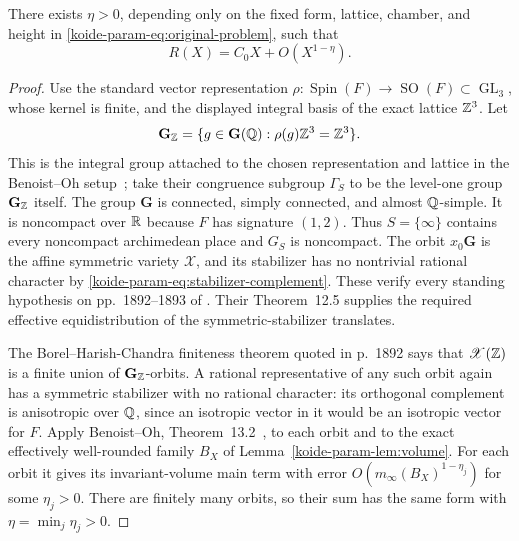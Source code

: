 \begin{theorem}
\label{koide-param-thm:power-saving}
There exists $\eta>0$, depending only on the fixed form, lattice, chamber,
and height in \eqref{koide-param-eq:original-problem}, such that
\begin{equation}
 R(X)=C_0X+O(X^{1-\eta}).
 \label{koide-param-eq:power-saving-again}
\end{equation}
\end{theorem}

\begin{proof}
Use the standard vector representation
$\rho:\operatorname{Spin}(F)\to\operatorname{SO}(F)\subset
\operatorname{GL}_3$, whose kernel is finite, and the displayed integral
basis of the exact lattice $\mathbb Z^3$.  Let
\[
 \mathbf G_{\mathbb Z}
 =\{g\in\mathbf G(\mathbb Q):\rho(g)\mathbb Z^3=\mathbb Z^3\}.
\]
This is the integral group attached to the chosen representation and
lattice in the Benoist--Oh setup~\cite[pp.~1892--1893]{BenoistOh_2012};
take their congruence subgroup
$\Gamma_S$ to be the level-one group $\mathbf G_{\mathbb Z}$ itself.  The group
$\mathbf G$ is connected,
simply connected, and almost $\mathbb Q$-simple.  It is noncompact over $\mathbb R$
because $F$ has signature $(1,2)$.  Thus $S=\{\infty\}$ contains every
noncompact archimedean place and $G_S$ is noncompact.  The orbit
$x_0\mathbf G$ is the affine symmetric variety $\mathscr X$, and its
stabilizer has no nontrivial rational character by
\eqref{koide-param-eq:stabilizer-complement}.  These verify every standing hypothesis
on pp.~1892--1893 of \cite{BenoistOh_2012}.  Their Theorem~12.5 supplies the required
effective equidistribution of the symmetric-stabilizer translates.

The Borel--Harish-Chandra finiteness theorem quoted in \cite[p.~1892]{BenoistOh_2012}
p.~1892 says that $\mathscr X(\mathbb Z)$ is a finite union of
$\mathbf G_{\mathbb Z}$-orbits.  A rational representative of any such orbit
again has a symmetric stabilizer with no rational
character: its orthogonal complement is anisotropic over $\mathbb Q$, since an
isotropic vector in it would be an isotropic vector for $F$.  Apply
Benoist--Oh, Theorem~13.2~\cite[pp.~1931--1932]{BenoistOh_2012}, to each orbit and to the exact effectively
well-rounded family $B_X$ of Lemma~\ref{koide-param-lem:volume}.  For each orbit it
gives its invariant-volume main term with error
$O(m_\infty(B_X)^{1-\eta_j})$ for some $\eta_j>0$.  There are finitely
many orbits, so their sum has the same form with
$\eta=\min_j\eta_j>0$.


\end{proof}
